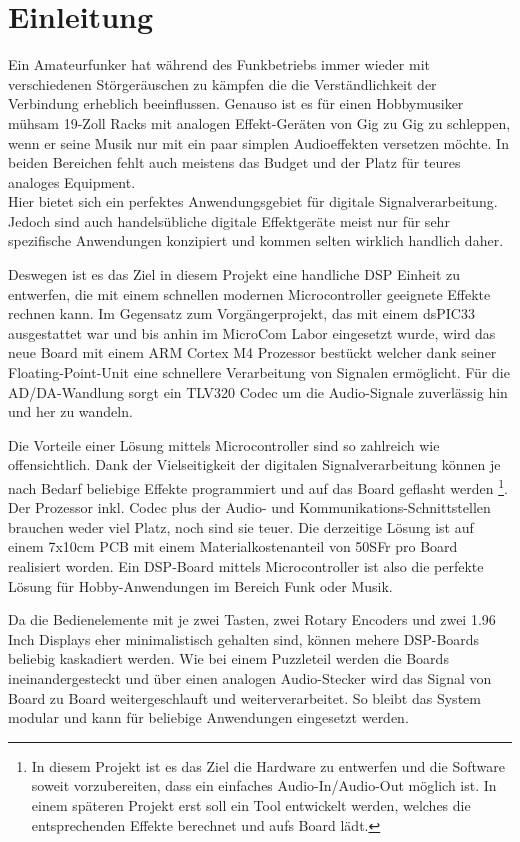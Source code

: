 \section{Einleitung}
\label{sec:Einleitung}

Ein Amateurfunker hat während des Funkbetriebs immer wieder mit verschiedenen Störgeräuschen zu kämpfen die die Verständlichkeit der Verbindung erheblich beeinflussen. Genauso ist es für einen Hobbymusiker mühsam 19-Zoll Racks mit analogen Effekt-Geräten von Gig zu Gig zu schleppen, wenn er seine Musik nur mit ein paar simplen Audioeffekten versetzen möchte. In beiden Bereichen fehlt auch meistens das Budget und der Platz für teures analoges Equipment.\\
Hier bietet sich ein perfektes Anwendungsgebiet für digitale Signalverarbeitung. Jedoch sind auch handelsübliche digitale Effektgeräte meist nur für sehr spezifische Anwendungen konzipiert und kommen selten wirklich handlich daher.

Deswegen ist es das Ziel in diesem Projekt eine handliche DSP Einheit zu entwerfen, die mit einem schnellen modernen Microcontroller geeignete Effekte rechnen kann. Im Gegensatz zum Vorgängerprojekt, das mit einem dsPIC33 ausgestattet war und bis anhin im MicroCom Labor eingesetzt wurde, wird das neue Board mit einem ARM Cortex M4 Prozessor bestückt welcher dank seiner Floating-Point-Unit eine schnellere Verarbeitung von Signalen ermöglicht. Für die AD/DA-Wandlung sorgt ein TLV320 Codec um die Audio-Signale zuverlässig hin und her zu wandeln.

Die Vorteile einer Lösung  mittels Microcontroller sind so zahlreich wie offensichtlich. Dank der Vielseitigkeit der digitalen Signalverarbeitung können je nach Bedarf beliebige Effekte programmiert und auf das Board geflasht werden \footnote{In diesem Projekt ist es das Ziel die Hardware zu entwerfen und die Software soweit vorzubereiten, dass ein einfaches Audio-In/Audio-Out möglich ist. In einem späteren Projekt erst soll ein Tool entwickelt werden, welches die entsprechenden Effekte berechnet und aufs Board lädt.}. Der Prozessor inkl. Codec plus der Audio- und Kommunikations-Schnittstellen brauchen weder viel Platz, noch sind sie teuer. Die derzeitige Lösung ist auf einem 7x10cm PCB mit einem Materialkostenanteil von 50SFr pro Board realisiert worden. Ein DSP-Board mittels Microcontroller ist also die perfekte Lösung für Hobby-Anwendungen im Bereich Funk oder Musik.

Da die Bedienelemente mit je zwei Tasten, zwei Rotary Encoders und zwei 1.96 Inch Displays eher minimalistisch gehalten sind, können mehere DSP-Boards beliebig kaskadiert werden. Wie bei einem Puzzleteil werden die Boards ineinandergesteckt und über einen analogen Audio-Stecker wird das Signal von Board zu Board weitergeschlauft und weiterverarbeitet. So bleibt das System modular und kann für beliebige Anwendungen eingesetzt werden.

